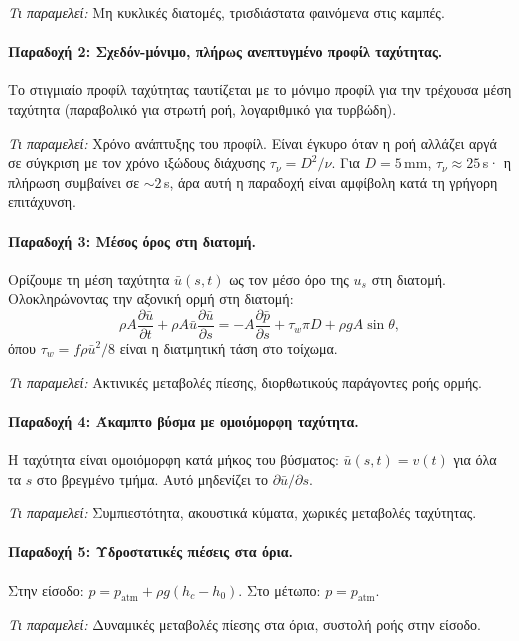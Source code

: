\documentclass[11pt]{article}
\begin{document}
\emph{Τι παραμελεί:} Μη κυκλικές διατομές, τρισδιάστατα φαινόμενα στις καμπές.

\paragraph{Παραδοχή 2: Σχεδόν-μόνιμο, πλήρως ανεπτυγμένο προφίλ ταχύτητας.}
Το στιγμιαίο προφίλ ταχύτητας ταυτίζεται με το μόνιμο προφίλ για την τρέχουσα μέση ταχύτητα (παραβολικό για στρωτή ροή, λογαριθμικό για τυρβώδη).

\emph{Τι παραμελεί:} Χρόνο ανάπτυξης του προφίλ. Είναι έγκυρο όταν η ροή αλλάζει αργά σε σύγκριση με τον χρόνο ιξώδους διάχυσης $\tau_\nu = D^2/\nu$. Για $D = 5$\,mm, $\tau_\nu \approx 25$\,s· η πλήρωση συμβαίνει σε $\sim 2$\,s, άρα αυτή η παραδοχή είναι αμφίβολη κατά τη γρήγορη επιτάχυνση.

\paragraph{Παραδοχή 3: Μέσος όρος στη διατομή.}
Ορίζουμε τη μέση ταχύτητα $\bar{u}(s,t)$ ως τον μέσο όρο της $u_s$ στη διατομή. Ολοκληρώνοντας την αξονική ορμή στη διατομή:
\[
  \rho A \frac{\partial \bar{u}}{\partial t} + \rho A \bar{u}\frac{\partial \bar{u}}{\partial s} = -A\frac{\partial \bar{p}}{\partial s} + \tau_w \pi D + \rho g A \sin\theta,
\]
όπου $\tau_w = f\rho\bar{u}^2/8$ είναι η διατμητική τάση στο τοίχωμα.

\emph{Τι παραμελεί:} Ακτινικές μεταβολές πίεσης, διορθωτικούς παράγοντες ροής ορμής.

\paragraph{Παραδοχή 4: Άκαμπτο βύσμα με ομοιόμορφη ταχύτητα.}
Η ταχύτητα είναι ομοιόμορφη κατά μήκος του βύσματος: $\bar{u}(s,t) = v(t)$ για όλα τα $s$ στο βρεγμένο τμήμα. Αυτό μηδενίζει το $\partial\bar{u}/\partial s$.

\emph{Τι παραμελεί:} Συμπιεστότητα, ακουστικά κύματα, χωρικές μεταβολές ταχύτητας.

\paragraph{Παραδοχή 5: Υδροστατικές πιέσεις στα όρια.}
Στην είσοδο: $p = p_{\text{atm}} + \rho g(h_c - h_0)$. Στο μέτωπο: $p = p_{\text{atm}}$.

\emph{Τι παραμελεί:} Δυναμικές μεταβολές πίεσης στα όρια, συστολή ροής στην είσοδο.
\end{document}
